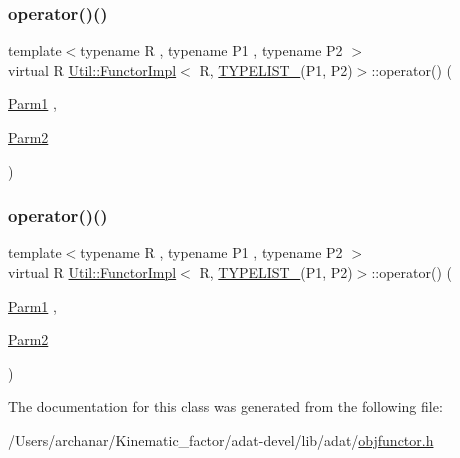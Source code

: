 \subsubsection{\texorpdfstring{operator()()}{operator()()}\hspace{0.1cm}{\footnotesize\ttfamily [2/3]}}
{\footnotesize\ttfamily template$<$typename R , typename P1 , typename P2 $>$ \\
virtual R \mbox{\hyperlink{classUtil_1_1FunctorImpl}{Util\+::\+Functor\+Impl}}$<$ R, \mbox{\hyperlink{adat__devel__install_2include_2adat_2typelist_8h_a311cb99af993804c6737ae46c5cbfaff}{T\+Y\+P\+E\+L\+I\+S\+T\+\_}}(P1, P2)$>$\+::operator() (\begin{DoxyParamCaption}\item[{\mbox{\hyperlink{structUtil_1_1Private_1_1FunctorImplBase_a9d61e693d6c616dea5bd9d9073c7d21a}{Parm1}}}]{,  }\item[{\mbox{\hyperlink{structUtil_1_1Private_1_1FunctorImplBase_a554085cd798ef14838a59b528f0feb2e}{Parm2}}}]{ }\end{DoxyParamCaption})\hspace{0.3cm}{\ttfamily [pure virtual]}}

\mbox{\label{classUtil_1_1FunctorImpl_3_01R_00_01TYPELIST__2_07P1_00_01P2_08_4_a5c9378116c2036cb377d239c8d454375}} 
\subsubsection{\texorpdfstring{operator()()}{operator()()}\hspace{0.1cm}{\footnotesize\ttfamily [3/3]}}
{\footnotesize\ttfamily template$<$typename R , typename P1 , typename P2 $>$ \\
virtual R \mbox{\hyperlink{classUtil_1_1FunctorImpl}{Util\+::\+Functor\+Impl}}$<$ R, \mbox{\hyperlink{adat__devel__install_2include_2adat_2typelist_8h_a311cb99af993804c6737ae46c5cbfaff}{T\+Y\+P\+E\+L\+I\+S\+T\+\_}}(P1, P2)$>$\+::operator() (\begin{DoxyParamCaption}\item[{\mbox{\hyperlink{structUtil_1_1Private_1_1FunctorImplBase_a9d61e693d6c616dea5bd9d9073c7d21a}{Parm1}}}]{,  }\item[{\mbox{\hyperlink{structUtil_1_1Private_1_1FunctorImplBase_a554085cd798ef14838a59b528f0feb2e}{Parm2}}}]{ }\end{DoxyParamCaption})\hspace{0.3cm}{\ttfamily [pure virtual]}}



The documentation for this class was generated from the following file\+:\begin{DoxyCompactItemize}
\item 
/\+Users/archanar/\+Kinematic\+\_\+factor/adat-\/devel/lib/adat/\mbox{\hyperlink{adat-devel_2lib_2adat_2objfunctor_8h}{objfunctor.\+h}}\end{DoxyCompactItemize}
